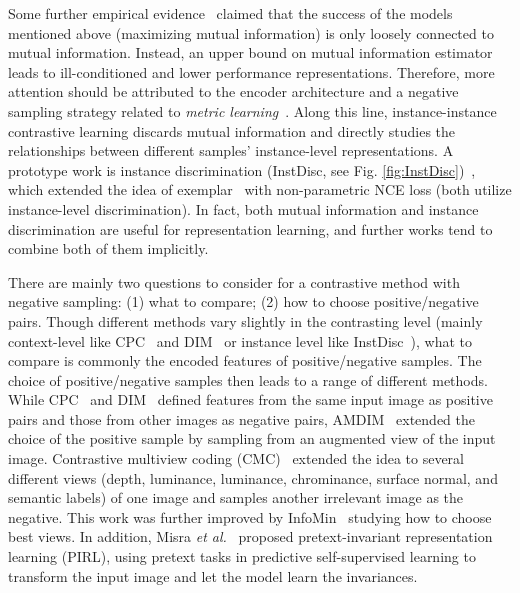 \documentclass[lettersize,journal]{IEEEtran}
\newcommand{\etal}{\textit{et al.}}
\begin{document}
Some further empirical evidence~\cite{tschannen2019mutual} claimed that the success of the models mentioned above (maximizing mutual information) is only loosely connected to mutual information. Instead, an upper bound on mutual information estimator leads to ill-conditioned and lower performance representations. Therefore, more attention should be attributed to the encoder architecture and a negative sampling strategy related to \textit{metric learning}~\cite{kulis2013metric}. Along this line, instance-instance contrastive learning discards mutual information and directly studies the relationships between different samples’ instance-level representations. A prototype work is instance discrimination (InstDisc, see Fig. \ref{fig:InstDisc})~\cite{wu2018unsupervised}, which extended the idea of exemplar~\cite{dosovitskiy2014discriminative} with non-parametric NCE loss (both utilize instance-level discrimination). In fact, both mutual information and instance discrimination are useful for representation learning, and further works tend to combine both of them implicitly.


There are mainly two questions to consider for a contrastive method with negative sampling: (1) what to compare; (2) how to choose positive/negative pairs. Though different methods vary slightly in the contrasting level (mainly context-level like CPC~\cite{oord2018representation} and DIM~\cite{hjelm2018learning} or instance level like InstDisc~\cite{wu2018unsupervised}), what to compare is commonly the encoded features  of positive/negative samples. The choice of positive/negative samples then leads to a range of different methods. While CPC~\cite{oord2018representation} and DIM~\cite{hjelm2018learning} defined features from the same input image as positive pairs and those from other images as negative pairs, AMDIM~\cite{bachman2019learning} extended the choice of the positive sample by sampling from an augmented view of the input image. Contrastive multiview coding (CMC)~\cite{tian2020contrastive} extended the idea to several different views (depth, luminance, luminance, chrominance, surface normal, and semantic labels) of one image and samples another irrelevant image as the negative. This work was further improved by InfoMin~\cite{tian2020makes} studying how to choose best views. In addition, Misra \etal~\cite{misra2020self} proposed pretext-invariant representation learning (PIRL), using pretext tasks in predictive self-supervised learning to transform the input image and let the model learn the invariances.
\end{document}
